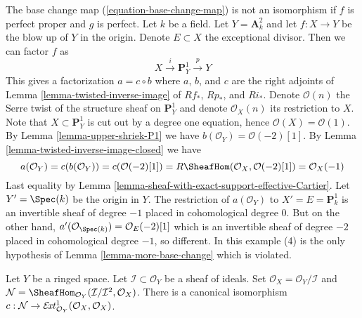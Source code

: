 \begin{example}
\label{example-base-change-wrong}
The base change map (\ref{equation-base-change-map}) is not an
isomorphism if $f$ is perfect proper and $g$ is perfect.
Let $k$ be a field. Let $Y = \mathbf{A}^2_k$ and let $f : X \to Y$
be the blow up of $Y$ in the origin. Denote $E \subset X$ the
exceptional divisor. Then we can factor $f$ as
$$
X \xrightarrow{i} \mathbf{P}^1_Y \xrightarrow{p} Y
$$
This gives a factorization $a = c \circ b$ where
$a$, $b$, and $c$ are the right adjoints of
Lemma \ref{lemma-twisted-inverse-image}
of $Rf_*$, $Rp_*$, and $Ri_*$. Denote $\mathcal{O}(n)$ the
Serre twist of the structure sheaf on $\mathbf{P}^1_Y$ and
denote $\mathcal{O}_X(n)$ its restriction to $X$.
Note that $X \subset \mathbf{P}^1_Y$ is cut out by
a degree one equation, hence $\mathcal{O}(X) = \mathcal{O}(1)$.
By Lemma \ref{lemma-upper-shriek-P1} we have
$b(\mathcal{O}_Y) = \mathcal{O}(-2)[1]$.
By Lemma \ref{lemma-twisted-inverse-image-closed}
we have
$$
a(\mathcal{O}_Y) = c(b(\mathcal{O}_Y)) =
c(\mathcal{O}(-2)[1]) =
R\SheafHom(\mathcal{O}_X, \mathcal{O}(-2)[1]) =
\mathcal{O}_X(-1)
$$
Last equality by Lemma \ref{lemma-sheaf-with-exact-support-effective-Cartier}.
Let $Y' = \Spec(k)$ be the origin in $Y$. The restriction of
$a(\mathcal{O}_Y)$ to $X' = E = \mathbf{P}^1_k$
is an invertible sheaf of degree $-1$ placed in cohomological
degree $0$. But on the other hand,
$a'(\mathcal{O}_{\Spec(k)}) = \mathcal{O}_E(-2)[1]$
which is an invertible sheaf of degree $-2$ placed in
cohomological degree $-1$, so different. In this example
(4) is the only hypothesis of Lemma \ref{lemma-more-base-change}
which is violated.
\end{example}

\begin{lemma}
\label{lemma-ext}
Let $Y$ be a ringed space. Let $\mathcal{I} \subset \mathcal{O}_Y$
be a sheaf of ideals. Set $\mathcal{O}_X = \mathcal{O}_Y/\mathcal{I}$ and
$\mathcal{N} =
\SheafHom_{\mathcal{O}_Y}(\mathcal{I}/\mathcal{I}^2, \mathcal{O}_X)$.
There is a canonical isomorphism
$c : \mathcal{N} \to
\mathcal{E}\!{\it xt}^1_{\mathcal{O}_Y}(\mathcal{O}_X, \mathcal{O}_X)
$.
\end{lemma}


